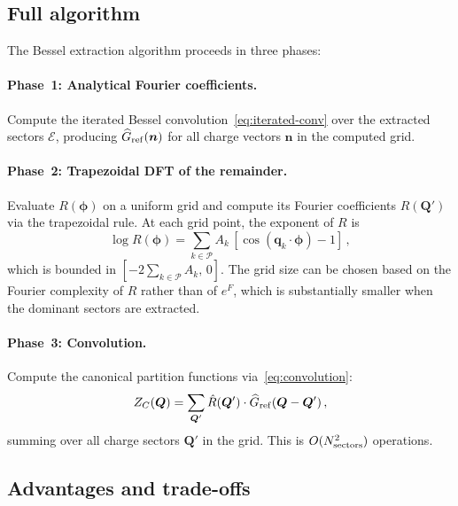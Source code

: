 \documentclass[11pt,a4paper]{article}
\newcommand{\bphi}{\bm{\phi}}
\newcommand{\bq}{\bm{q}}
\newcommand{\bQ}{\bm{Q}}
\begin{document}
\subsection{Full algorithm}
\label{sec:bessel-algorithm}

The Bessel extraction algorithm proceeds in three phases:

\paragraph{Phase~1: Analytical Fourier coefficients.}
Compute the iterated Bessel convolution~\cref{eq:iterated-conv} over the extracted sectors $\mathcal{E}$, producing $\widehat{G}_{\rm ref}(\bm{n})$ for all charge vectors $\bm{n}$ in the computed grid.

\paragraph{Phase~2: Trapezoidal DFT of the remainder.}
Evaluate $R(\bphi)$ on a uniform grid and compute its Fourier coefficients $\hat{R}(\bQ')$ via the trapezoidal rule.
At each grid point, the exponent of $R$ is
\begin{equation}\label{eq:remainder-exponent}
  \log R(\bphi) = \sum_{k \in \mathcal{P}} A_k\,[\cos(\bq_k \cdot \bphi) - 1]\,,
\end{equation}
which is bounded in $[-2\sum_{k \in \mathcal{P}} A_k,\, 0]$.
The grid size can be chosen based on the Fourier complexity of $R$ rather than of $e^F$, which is substantially smaller when the dominant sectors are extracted.

\paragraph{Phase~3: Convolution.}
Compute the canonical partition functions via~\cref{eq:convolution}:
\begin{equation}
  Z_C(\bQ) = \sum_{\bQ'} \hat{R}(\bQ') \cdot \widehat{G}_{\rm ref}(\bQ - \bQ')\,,
\end{equation}
summing over all charge sectors $\bQ'$ in the grid.
This is $O(N_{\rm sectors}^2)$ operations.

\subsection{Advantages and trade-offs}
\label{sec:bessel-tradeoffs}
\end{document}
